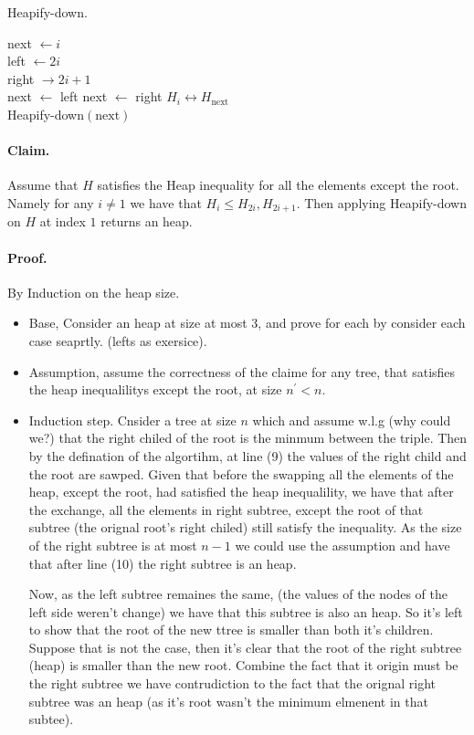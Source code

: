 \begin{algbox}{Heapify-down.}
\begin{algorithm}[H]
{}
next  $\leftarrow i  $ \\
left  $\leftarrow 2i $ \\
right $\rightarrow 2i +1 $ \\ 
 {
  next $\leftarrow$ left 
}
 {
  next $\leftarrow$  right
}
 {
  $ H_{i} \leftrightarrow H_{\text{next}} $ \\ 
  Heapify-down$\left( \text{next}  \right)$
}
\end{algorithm}
\end{algbox}
\paragraph{Claim.} Assume that $H$ satisfies the Heap inequality for all the elements except the root. Namely for any $i \neq 1$ we have that $H_{i} \le H_{2i}, H_{2i+1}$. Then applying Heapify-down on $H$ at index $1$ returns an heap. 
\paragraph{Proof.} By Induction on the heap size. 

\begin{itemize}
  \item Base, Consider an heap at size at most 3, and prove for each by consider each case seaprtly. (lefts as exersice). 
  \item Assumption, assume the correctness of the claime for any tree, that satisfies the heap inequalilitys except the root, at size $n^{\prime} < n$.
  \item Induction step. Cnsider a tree at size $n$ which and assume w.l.g (why could we?) that the right chiled of the root is the minmum between the triple. Then by the defination of the algortihm, at line (9) the values of the right child and the root are sawped. Given that before the swapping all the elements of the heap, except the root, had satisfied the heap inequalility, we have that after the exchange, all the elements in right subtree, except the root of that subtree (the orignal root's right chiled) still satisfy the inequality. As the size of the right subtree is at most $n-1$ we could use the assumption and have that after line (10) the right subtree is an heap. 

    Now, as the left subtree remaines the same, (the values of the nodes of the left side weren't change) we have that this subtree is also an heap. So it's left to show that the root of the new ttree is smaller than both it's children. Suppose that is not the case, then it's clear that the root of the right subtree (heap) is smaller than the new root. Combine the fact that it origin must be the right subtree we have contrudiction to the fact that the orignal right subtree was an heap (as it's root wasn't the minimum elmenent in that subtee). 

\end{itemize}
